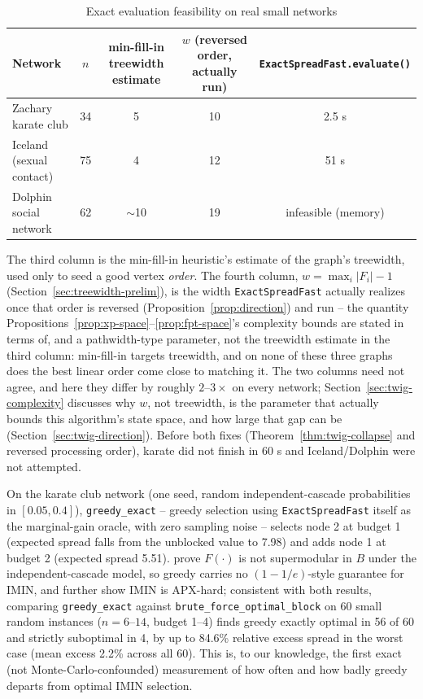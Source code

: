 \documentclass[ASNA,number]{USG}
\newcommand{\up}{\rule{0pt}{2.6ex}}
\newcommand{\down}{\rule[-1.2ex]{0pt}{0pt}}
\newcommand{\FF}{F}
\begin{document}
\begin{table}[h]
\centering
\caption{Exact evaluation feasibility on real small networks\label{tab:twig-feasibility}}
\begin{tabular}{@{}lcccc@{}}
\hline
\up Network & $n$ & min-fill-in treewidth estimate & $w$ (reversed order, actually run) & \texttt{ExactSpreadFast.evaluate()} \\
\hline
\up Zachary karate club & 34 & 5 & 10 & 2.5 s \\
Iceland (sexual contact) & 75 & 4 & 12 & 51 s \\
\down Dolphin social network & 62 & $\sim$10 & 19 & infeasible (memory) \\
\hline
\end{tabular}
The third column is the min-fill-in heuristic's estimate of the graph's
treewidth, used only to seed a good vertex \emph{order}. The fourth column,
$w=\max_i|F_i|-1$ (Section~\ref{sec:treewidth-prelim}), is the width
\texttt{ExactSpreadFast} actually realizes once that order is reversed
(Proposition~\ref{prop:direction}) and run -- the quantity
Propositions~\ref{prop:xp-space}--\ref{prop:fpt-space}'s complexity bounds
are stated in terms of, and a pathwidth-type parameter, not the treewidth
estimate in the third column: min-fill-in targets treewidth, and on none of
these three graphs does the best linear order come close to matching it.
The two columns need not agree, and here they differ by roughly $2$--$3\times$
on every network; Section~\ref{sec:twig-complexity} discusses why $w$, not
treewidth, is the parameter that actually bounds this algorithm's state
space, and how large that gap can be (Section~\ref{sec:twig-direction}).
Before both fixes (Theorem~\ref{thm:twig-collapse} and reversed processing
order), karate did not finish in 60 s and Iceland/Dolphin were not
attempted.
\end{table}

On the karate club network (one seed, random independent-cascade
probabilities in $[0.05,0.4]$), \texttt{greedy\_exact} -- greedy selection
using \texttt{ExactSpreadFast} itself as the marginal-gain oracle, with zero
sampling noise -- selects node 2 at budget 1 (expected spread falls from the
unblocked value to 7.98) and adds node 1 at budget 2 (expected spread
5.51). \citet{xie2023} prove $\FF(\cdot)$ is not supermodular in $B$ under
the independent-cascade model, so greedy carries no $(1-1/e)$-style
guarantee for IMIN, and \citet{xie2024} further show IMIN is APX-hard;
consistent with both results, comparing \texttt{greedy\_exact} against
\texttt{brute\_force\_optimal\_block} on 60 small random instances
($n=6$--$14$, budget 1--4) finds greedy exactly optimal in 56 of 60 and
strictly suboptimal in 4, by up to 84.6\% relative excess spread in the
worst case (mean excess 2.2\% across all 60). This is, to our knowledge, the
first exact (not Monte-Carlo-confounded) measurement of how often and how
badly greedy departs from optimal IMIN selection.
\end{document}
